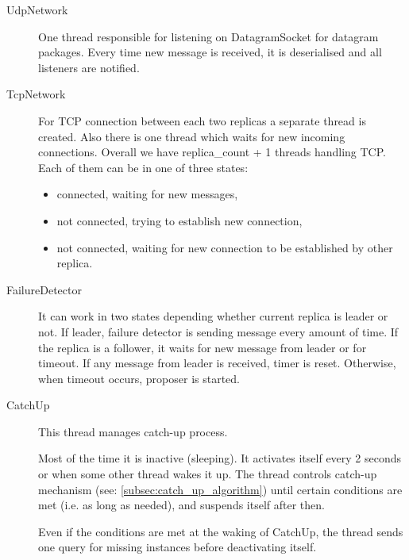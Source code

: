 \begin{description}
	\item[UdpNetwork] \hfill

		One thread responsible for listening on DatagramSocket for datagram packages. Every time new message is received, it is deserialised and all listeners are notified. 

	\item[TcpNetwork] \hfill

		For TCP connection between each two replicas a separate thread is created. Also there is one thread which waits for new incoming connections. Overall we have replica\_count + 1 threads handling TCP. Each of them can be in one of three states:
		\begin{itemize}
			\item connected, waiting for new messages,
			\item not connected, trying to establish new connection,
			\item not connected, waiting for new connection to be established by other replica.
		\end{itemize}

	\item[FailureDetector] \hfill

	 It can work in two states depending whether current replica is leader or not. If leader, failure detector is sending \alive message every amount of time. If the replica is a follower, it waits for new message from leader or for timeout. If any message from leader is received, timer is reset. Otherwise, when timeout occurs, proposer is started.

  \item[CatchUp]\hfill

    This thread manages catch-up process.

    Most of the time it is inactive (sleeping). It activates itself every 2 seconds or when some other thread wakes it up. The thread controls catch-up mechanism (see: \ref{subsec:catch_up_algorithm}) until certain conditions are met (i.e. as long as needed), and suspends itself after then.
    
    Even if the conditions are met at the waking of CatchUp, the thread sends one query for missing instances before deactivating itself.
\end{description}
